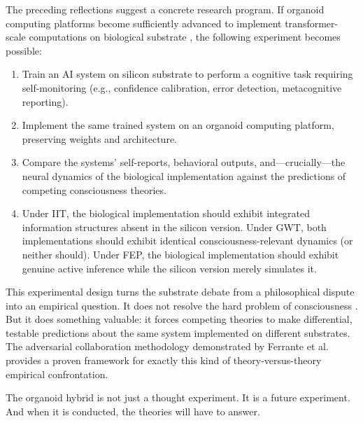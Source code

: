 The preceding reflections suggest a concrete research program. If organoid computing
platforms become sufficiently advanced to implement transformer-scale computations
on biological substrate \cite{smirnova2023organoid, leung2025array}, the following
experiment becomes possible:

\begin{enumerate}[label=(\roman*)]
  \item Train an AI system on silicon substrate to perform a cognitive task requiring
    self-monitoring (e.g., confidence calibration, error detection, metacognitive
    reporting).
  \item Implement the same trained system on an organoid computing platform,
    preserving weights and architecture.
  \item Compare the systems' self-reports, behavioral outputs, and---crucially---the
    neural dynamics of the biological implementation against the predictions of
    competing consciousness theories.
  \item Under IIT, the biological implementation should exhibit integrated information
    structures absent in the silicon version. Under GWT, both implementations should
    exhibit identical consciousness-relevant dynamics (or neither should). Under FEP,
    the biological implementation should exhibit genuine active inference while the
    silicon version merely simulates it.
\end{enumerate}

This experimental design turns the substrate debate from a philosophical dispute into
an empirical question. It does not resolve the hard problem of consciousness
\cite{chalmers1995facing}. But it does something valuable: it forces competing
theories to make differential, testable predictions about the same system implemented
on different substrates. The adversarial collaboration methodology demonstrated by
Ferrante et al.\ \cite{ferrante2025adversarial} provides a proven framework for
exactly this kind of theory-versus-theory empirical confrontation.

The organoid hybrid is not just a thought experiment. It is a future experiment. And
when it is conducted, the theories will have to answer.
